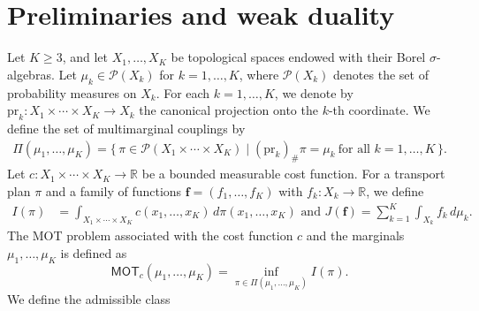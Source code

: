 \documentclass[twoside,11pt,a4paper]{article}
\begin{document}
\section{Preliminaries and weak duality}\label{wd} 
Let \(K \ge 3\), and let \(X_1,\ldots,X_K\) be topological spaces endowed with their Borel \(\sigma\)-algebras. Let \(\mu_k \in \mathcal{P}(X_k)\) for \(k=1,\dots,K\), where \(\mathcal{P}(X_k)\) denotes the set of probability measures on \(X_k\). For each $k=1,\dots,K$, we denote by $\mathrm{pr}_k: X_1 \times \cdots \times X_K \to X_k$ the canonical projection onto the $k$-th coordinate. We define the set of multimarginal couplings by
\begin{align*}
\Pi(\mu_1,\dots,\mu_K)
= \bigl\{\, \pi \in \mathcal{P}(X_1 \times \cdots \times X_K)
\;|\; (\mathrm{pr}_k)_{\#}\pi = \mu_k \ \text{for all } k=1,\dots,K \,\bigr\}.
\end{align*}
Let $c : X_1 \times \cdots \times X_K \to \mathbb{R}$ be a bounded measurable cost function.
For a transport plan $\pi$ and a family of functions $\boldsymbol{f} = (f_1,\dots,f_K)$
with $f_k : X_k \to \mathbb{R}$, we define
\begin{align*}
I(\pi)
&= \int_{X_1 \times \cdots \times X_K}
c(x_1,\ldots,x_K)\, d\pi(x_1,\ldots,x_K)  \text{  and   } 
J(\boldsymbol{f})
= \sum_{k=1}^{K} \int_{X_k} f_k\, d\mu_k.
\end{align*}
The MOT problem associated with the cost function $c$
and the marginals $\mu_1,\ldots,\mu_K$ is defined as
\begin{equation*}
\mathsf{MOT}_c(\mu_1,\ldots,\mu_K)
= \inf_{\pi \in \Pi(\mu_1,\ldots,\mu_K)} I(\pi).
\end{equation*}
We define the admissible class
\end{document}
